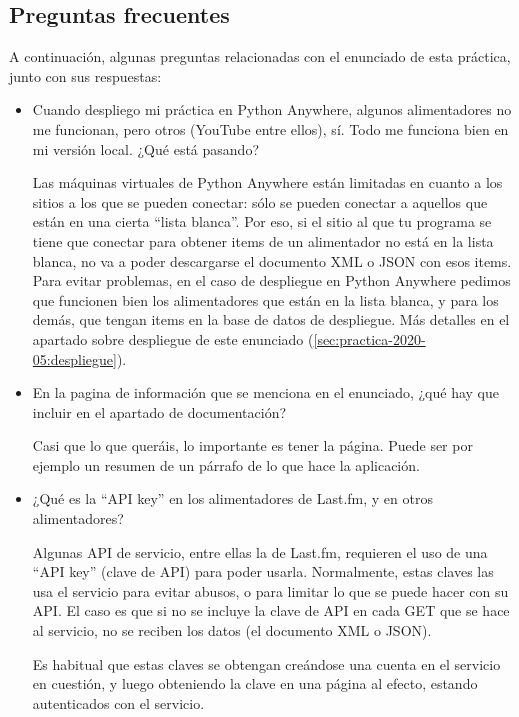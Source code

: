 \subsection{Preguntas frecuentes}
\label{sec:practica-2020-05:preguntas}

A continuación, algunas preguntas relacionadas con el enunciado de esta práctica, junto con sus respuestas:

\begin{itemize}

\item Cuando despliego mi práctica en Python Anywhere, algunos alimentadores no me funcionan, pero otros (YouTube entre ellos), sí. Todo me funciona bien en mi versión local. ¿Qué está pasando?

  Las máquinas virtuales de Python Anywhere están limitadas en cuanto a los sitios a los que se pueden conectar: sólo se pueden conectar a aquellos que están en una cierta ``lista blanca''. Por eso, si el sitio al que tu programa se tiene que conectar para obtener items de un alimentador no está en la lista blanca, no va a poder descargarse el documento XML o JSON con esos items. Para evitar problemas, en el caso de despliegue en Python Anywhere pedimos que funcionen bien los alimentadores que están en la lista blanca, y para los demás, que tengan items en la base de datos de despliegue. Más detalles en el apartado sobre despliegue de este enunciado (\ref{sec:practica-2020-05:despliegue}).
  
\item En la pagina de información que se menciona en el enunciado, ¿qué hay que incluir en el apartado de documentación?

Casi que lo que queráis, lo importante es tener la página. Puede ser por ejemplo un resumen de un párrafo de lo que hace la aplicación.

\item ¿Qué es la ``API key'' en los alimentadores de Last.fm, y en otros alimentadores?
\label{sec:practica-2020-05:preguntas-apikey}

  Algunas API de servicio, entre ellas la de Last.fm, requieren el uso de una ``API key'' (clave de API) para poder usarla. Normalmente, estas claves las usa el servicio para evitar abusos, o para limitar lo que se puede hacer con su API. El caso es que si no se incluye la clave de API en cada GET que se hace al servicio, no se reciben los datos (el documento XML o JSON).

  Es habitual que estas claves se obtengan creándose una cuenta en el servicio en cuestión, y luego obteniendo la clave en una página al efecto, estando autenticados con el servicio.


\end{itemize}
